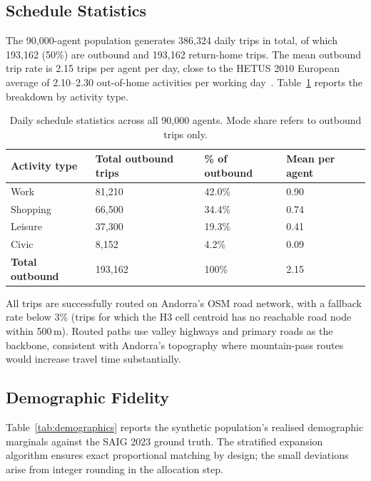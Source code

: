 \documentclass[sustainability,article,submit,pdftex,moreauthors]{Definitions/mdpi}
\begin{document}
\subsection{Schedule Statistics}
\label{subsec:schedule_results}

The 90,000-agent population generates 386,324 daily trips in total,
of which 193,162 (50\%) are outbound and 193,162 return-home trips.
The mean outbound trip rate is 2.15 trips per agent per day, close to
the HETUS 2010 European average of 2.10--2.30 out-of-home
activities per working day~\cite{hetus2010}. Table~\ref{tab:schedule_stats}
reports the breakdown by activity type.

\begin{table}[H]
\caption{Daily schedule statistics across all 90,000 agents.
Mode share refers to outbound trips only.}
\label{tab:schedule_stats}
\begin{tabularx}{\textwidth}{lXXX}
\toprule
\textbf{Activity type} & \textbf{Total outbound trips} & \textbf{\% of outbound}
                       & \textbf{Mean per agent} \\
\midrule
Work     & 81,210  & 42.0\% & 0.90 \\
Shopping & 66,500  & 34.4\% & 0.74 \\
Leisure  & 37,300  & 19.3\% & 0.41 \\
Civic    &  8,152  &  4.2\% & 0.09 \\
\midrule
\textbf{Total outbound} & 193,162 & 100\% & 2.15 \\
\bottomrule
\end{tabularx}
\end{table}

All trips are successfully routed on Andorra's OSM road network, with
a fallback rate below 3\% (trips for which the H3 cell centroid has
no reachable road node within 500\,m). Routed paths use valley highways
and primary roads as the backbone, consistent with Andorra's topography
where mountain-pass routes would increase travel time substantially.

\subsection{Demographic Fidelity}
\label{subsec:demographic_fidelity}

Table~\ref{tab:demographics} reports the synthetic population's realised
demographic marginals against the SAIG 2023 ground truth. The stratified
expansion algorithm ensures exact proportional matching by design; the
small deviations arise from integer rounding in the allocation step.
\end{document}
